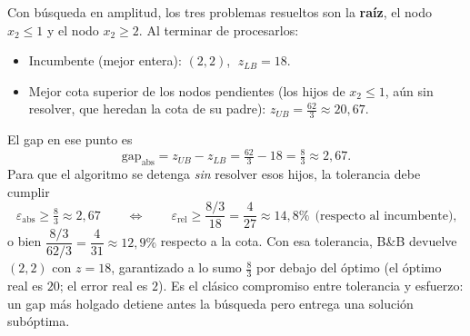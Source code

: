 \begin{enumerate}
Con b\'usqueda en amplitud, los tres problemas resueltos son la \textbf{ra\'iz}, el nodo
\textbf{$x_2\le1$} y el nodo \textbf{$x_2\ge2$}. Al terminar de procesarlos:
\begin{itemize}[nosep]
  \item Incumbente (mejor entera): $(2,2)$, $\;z_{LB}=18$.
  \item Mejor cota superior de los nodos pendientes (los hijos de $x_2\le1$, a\'un sin resolver,
        que heredan la cota de su padre): $z_{UB}=\tfrac{62}{3}\approx 20{,}67$.
\end{itemize}
El gap en ese punto es
\[
\text{gap}_{\text{abs}} = z_{UB}-z_{LB} = \tfrac{62}{3}-18 = \tfrac{8}{3}\approx 2{,}67.
\]
Para que el algoritmo se detenga \emph{sin} resolver esos hijos, la tolerancia debe cumplir
\[
\boxed{\varepsilon_{\text{abs}} \ge \tfrac{8}{3}\approx 2{,}67}
\qquad\Longleftrightarrow\qquad
\varepsilon_{\text{rel}} \ge \frac{8/3}{18} = \frac{4}{27}\approx 14{,}8\%
\ \ \text{(respecto al incumbente),}
\]
o bien $\dfrac{8/3}{62/3}=\dfrac{4}{31}\approx 12{,}9\%$ respecto a la cota. Con esa tolerancia, B\&B
devuelve $(2,2)$ con $z=18$, garantizado a lo sumo $\tfrac{8}{3}$ por debajo del \'optimo (el \'optimo
real es $20$; el error real es $2$). Es el clásico compromiso entre tolerancia y esfuerzo: un gap m\'as
holgado detiene antes la b\'usqueda pero entrega una soluci\'on sub\'optima.
\end{enumerate}
